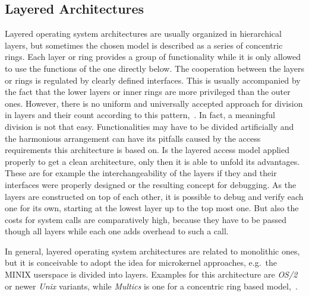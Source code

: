 \subsection{Layered Architectures}
Layered operating system architectures are usually organized in hierarchical layers, but sometimes the chosen model is described as a series of concentric rings.
Each layer or ring provides a group of functionality while it is only allowed to use the functions of the one directly below. 
The cooperation between the layers or rings is regulated by clearly defined interfaces\cite{brause2017betriebssysteme}.
This is usually accompanied by the fact that the lower layers or inner rings are more privileged than the outer ones.
However, there is no uniform and universally accepted approach for division in layers and their count according to this pattern\cite{glatz2015betriebssysteme},~\cite{tanenbaum-modern-operating-systems}.
In fact, a meaningful division is not that easy.
Functionalities may have to be divided artificially and the harmonious arrangement can have its pitfalls caused by the access requirements this architecture is based on.
Is the layered access model applied properly to get a clean architecture, only then it is able to unfold its advantages.
These are for example the interchangeability of the layers if they and their interfaces were properly designed or the resulting concept for debugging.
As the layers are constructed on top of each other, it is possible to debug  and verify each one for its own, starting at the lowest layer up to the top most one\cite{silberschatz2009operating}.
But also the costs for system calls are comparatively high, because they have to be passed though all layers while each one adds overhead to such a call\cite{silberschatz2009operating}.  

In general, layered operating system architectures are related to monolithic ones, but it is conceivable to adopt the idea for microkernel approaches, e.g.\ the MINIX userspace is divided into layers. 
Examples for this architecture are \textit{OS/2} or newer \textit{Unix} variants, while \textit{Multics} is one for a concentric ring based model\cite{glatz2015betriebssysteme},~\cite{tanenbaum-modern-operating-systems}.




